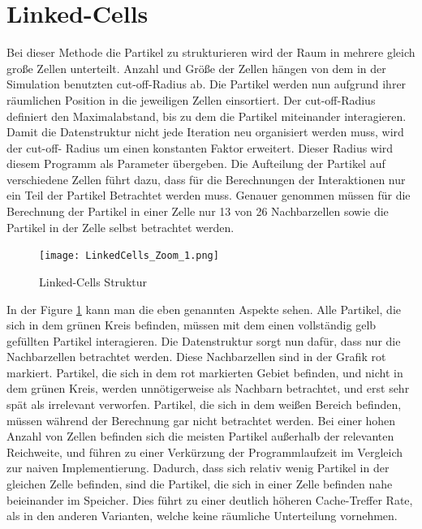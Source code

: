\documentclass[
12pt,
a4paper,
BCOR10mm,
DIV14,
headsepline,
]{scrreprt}
\begin{document}
	\section{Linked-Cells}%
	Bei dieser Methode die Partikel zu strukturieren wird der Raum in mehrere gleich große Zellen unterteilt. Anzahl und Größe der Zellen hängen von dem in der Simulation benutzten cut-off-Radius ab. Die Partikel werden nun aufgrund ihrer räumlichen Position in die jeweiligen Zellen einsortiert. Der cut-off-Radius definiert den Maximalabstand, bis zu dem die Partikel miteinander interagieren. Damit die Datenstruktur nicht jede Iteration neu organisiert werden muss, wird der cut-off- Radius um einen konstanten Faktor erweitert. Dieser Radius wird diesem Programm als Parameter übergeben. Die Aufteilung der Partikel auf verschiedene Zellen führt dazu, dass für die Berechnungen der Interaktionen nur ein Teil der Partikel Betrachtet werden muss. Genauer genommen müssen für die Berechnung der Partikel in einer Zelle nur 13 von 26 Nachbarzellen sowie die Partikel in der Zelle selbst betrachtet werden.
	\begin{figure}[h]
		\centering
		\texttt{[image: LinkedCells\_Zoom\_1.png]}
		\caption{Linked-Cells Struktur}
		\label{figure:LinkedCellsStructure}
	\end{figure}
	In der Figure \ref{figure:LinkedCellsStructure} kann man die eben genannten Aspekte sehen. Alle Partikel, die sich in dem grünen Kreis befinden, müssen mit dem einen vollständig gelb gefüllten Partikel interagieren. Die Datenstruktur sorgt nun dafür, dass nur die Nachbarzellen betrachtet werden. Diese Nachbarzellen sind in der Grafik rot markiert. Partikel, die sich in dem rot markierten Gebiet befinden, und nicht in dem grünen Kreis, werden unnötigerweise als Nachbarn betrachtet, und erst sehr spät als irrelevant verworfen. Partikel, die sich in dem weißen Bereich befinden, müssen während der Berechnung gar nicht betrachtet werden. Bei einer hohen Anzahl von Zellen befinden sich die meisten Partikel außerhalb der relevanten Reichweite, und führen zu einer Verkürzung der Programmlaufzeit im Vergleich zur naiven Implementierung. Dadurch, dass sich relativ wenig Partikel in der gleichen Zelle befinden, sind die Partikel, die sich in einer Zelle befinden nahe beieinander im Speicher. Dies führt zu einer deutlich höheren Cache-Treffer Rate, als in den anderen Varianten, welche keine räumliche Unterteilung vornehmen.
\end{document}
